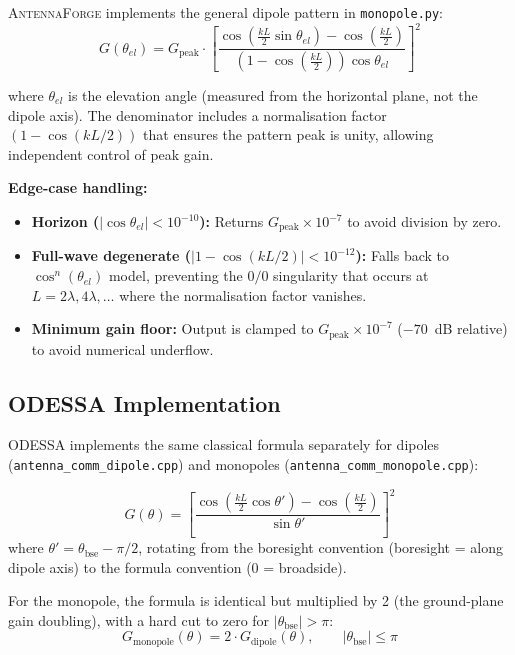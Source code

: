\documentclass[11pt,a4paper]{article}
\newcommand{\AF}{\textsc{AntennaForge}}
\newcommand{\OD}{\textsc{ODESSA}}
\begin{document}
\AF{} implements the general dipole pattern in \texttt{monopole.py}:
\begin{equation}
  G(\theta_{el}) = G_{\text{peak}} \cdot
    \left[
      \frac{\cos\!\left(\frac{kL}{2}\sin\theta_{el}\right)
            - \cos\!\left(\frac{kL}{2}\right)}
           {\left(1 - \cos\!\left(\frac{kL}{2}\right)\right) \cos\theta_{el}}
    \right]^2
  \label{eq:af_dipole}
\end{equation}

where $\theta_{el}$ is the elevation angle (measured from the horizontal plane,
not the dipole axis).  The denominator includes a normalisation factor
$(1 - \cos(kL/2))$ that ensures the pattern peak is unity, allowing independent
control of peak gain.

\textbf{Edge-case handling:}
\begin{itemize}[leftmargin=2em]
  \item \textbf{Horizon ($|\cos\theta_{el}| < 10^{-10}$):} Returns
        $G_\text{peak} \times 10^{-7}$ to avoid division by zero.
  \item \textbf{Full-wave degenerate ($|1 - \cos(kL/2)| < 10^{-12}$):}
        Falls back to $\cos^n(\theta_{el})$ model, preventing the $0/0$
        singularity that occurs at $L = 2\lambda, 4\lambda, \ldots$ where the
        normalisation factor vanishes.
  \item \textbf{Minimum gain floor:} Output is clamped to
        $G_\text{peak} \times 10^{-7}$ ($-70$~dB relative) to avoid
        numerical underflow.
\end{itemize}

\subsection{\OD{} Implementation}

\OD{} implements the same classical formula separately for dipoles
(\texttt{antenna\_comm\_dipole.cpp}) and monopoles
(\texttt{antenna\_comm\_monopole.cpp}):

\begin{equation}
  G(\theta) = \left[
    \frac{\cos\!\left(\frac{kL}{2}\cos\theta'\right)
          - \cos\!\left(\frac{kL}{2}\right)}{\sin\theta'}
  \right]^2
  \label{eq:od_dipole}
\end{equation}
where $\theta' = \theta_{\text{bse}} - \pi/2$, rotating from the boresight
convention (boresight = along dipole axis) to the formula convention (0 = broadside).

For the monopole, the formula is identical but multiplied by 2 (the ground-plane
gain doubling), with a hard cut to zero for $|\theta_{\text{bse}}| > \pi$:
\begin{equation}
  G_{\text{monopole}}(\theta) = 2 \cdot G_{\text{dipole}}(\theta),
  \qquad |\theta_{\text{bse}}| \leq \pi
\end{equation}
\end{document}
